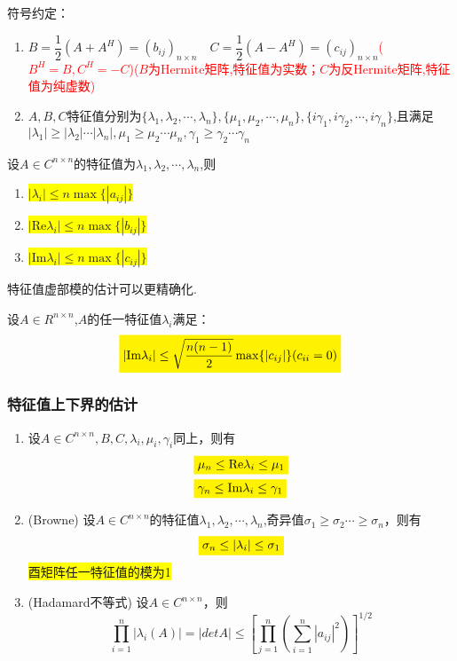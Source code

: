 \noindent 符号约定：

\begin{enumerate}
\item $B=\dfrac{1}{2}(A+A^H)=(b_{ij})_{n\times n}\quad 	C=\dfrac{1}{2}(A-A^H)=(c_{ij})_{n\times n}$\textcolor{red}{($B^H=B,C^H=-C$)($B$为Hermite矩阵,特征值为实数；$C$为反Hermite矩阵,特征值为纯虚数)}
\item $A,B,C$特征值分别为$\{\lambda_1,\lambda_2,\cdots,\lambda_n\},\{\mu_1,\mu_2,\cdots,\mu_n\},\{i\gamma_1,i\gamma_2,\cdots,i\gamma_n\}$,且满足$|\lambda_1|\geq|\lambda_2|\cdots|\lambda_n|, \mu_1\geq\mu_2\cdots\mu_n,\gamma_1\geq\gamma_2\cdots\gamma_n$
\end{enumerate}
\begin{theorem}[Hirsh]
	设$A\in C^{n\times n}$的特征值为$\lambda_1,\lambda_2,\cdots,\lambda_n$,则
	\begin{enumerate}
		\item \colorbox{yellow}{$|\lambda_{i} |\leq n \max \{|a_{ij}|\}$}
		\item \colorbox{yellow}{$|\mathrm{Re}\lambda_{i} |\leq n \max \{|b_{ij}|\}$}
		\item \colorbox{yellow}{$|\mathrm{Im}\lambda_{i} |\leq n \max \{|c_{ij}|\}$}
	\end{enumerate}
\end{theorem}

\noindent 特征值虚部模的估计可以更精确化.
\begin{theorem}[Bendixsion]
设$A\in R^{n\times n}$,$A$的任一特征值$\lambda_i$满足：
\[
\colorbox{yellow}{$
|\mathrm{Im}\lambda_{i}|\leq\sqrt{\dfrac{n(n-1)}{2}}\max \{|c_{ij}|\}(c_{ii}=0)
$}\]
\end{theorem}

\subsubsection{特征值上下界的估计}

\begin{theorem}
\begin{enumerate}
	\item 设$A\in C^{n\times n},B,C,\lambda_i,\mu_i,\gamma_i$同上，则有
	\[
	\begin{split}
		&\colorbox{yellow}{$\mu_n\leq \mathrm{Re}\lambda_{i}\leq\mu_1$}\\
		&\colorbox{yellow}{$\gamma_n\leq \mathrm{Im}\lambda_{i}\leq\gamma_1$}
	\end{split}
	\]
	\item(Browne) 
	设$A\in C^{n\times n}$的特征值$\lambda_1,\lambda_2,\cdots,\lambda_n$,奇异值$\sigma_1\geq\sigma_2\cdots\geq\sigma_n$，则有
	\[
	\colorbox{yellow}{$\sigma_n\leq|\lambda_i|\leq\sigma_1$}
	\]
	\colorbox{yellow}{酉矩阵任一特征值的模为1}
	\item(Hadamard不等式) 设$A\in C^{n\times n}$，则
	\[
	\prod\limits_{i=1}^{n}|\lambda_i(A)|=|detA|\leq\left[\prod\limits_{j=1}^{n}\left( \sum\limits_{i=1}^{n}|a_{ij}|^2\right)\right]^{1/2}
	\]
\end{enumerate}
\end{theorem}

